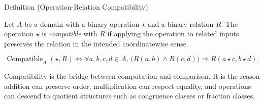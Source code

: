 \begin{definitionbox}{Definition (Operation-Relation Compatibility)}
\begin{definition}
\label{def:operation-relation-compatibility}
Let $A$ be a domain with a binary operation $\star$ and a binary relation $R$.
The operation $\star$ is \emph{compatible} with $R$ if applying the operation
to related inputs preserves the relation in the intended coordinatewise sense.
\end{definition}

\begin{remark*}
\[
\operatorname{Compatible}_A(\star,R)
\Longleftrightarrow
\forall a,b,c,d \in A,\,
\bigl(R(a,b) \land R(c,d)\bigr)
\Rightarrow
R(a \star c, b \star d).
\]
\end{remark*}

\begin{remark*}[Interpretation]
Compatibility is the bridge between computation and comparison. It is the
reason addition can preserve order, multiplication can respect equality, and
operations can descend to quotient structures such as congruence classes or
fraction classes.
\end{remark*}

\NoLocalDependencies
\end{definitionbox}

